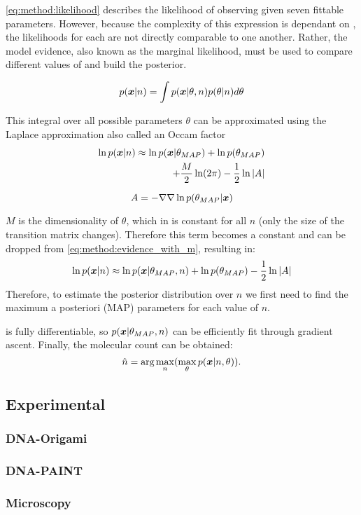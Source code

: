 \eqref{eq:method:likelihood} describes the likelihood of observing \trace given seven fittable parameters.
  However, because the complexity of this expression is dependant on \n, the likelihoods for each \n are not directly comparable to one another.
  Rather, the model evidence, also known as the marginal likelihood, must be used to compare different values of \n and build the posterior. 

  \begin{equation*}
    p(\bm{x} | n) = \int p(\bm{x} | \theta, n) p(\theta | n) d\theta
  \end{equation*}

  This integral over all possible parameters $\theta$ can be approximated using the 
  Laplace approximation also called an Occam factor \cite{bishop_pattern_2006}
  \begin{align*}
    \ln p(\bm{x} | n) \approx \ln p(\bm{x} | \theta_{MAP}) + \ln p(\theta_{MAP}) &\\
    + \frac{M}{2} \ln(2\pi) - \frac{1}{2} \ln |A|
    \label{eq:method:evidence_with_m}
  \end{align*}

  \begin{equation*}
    A = -\nabla \nabla \ln p(\theta_{MAP} | \bm{x})
  \end{equation*}

  $M$ is the dimensionality of $\theta$, which in \ours is constant
  for all $n$ (only the size of the transition matrix changes).
  Therefore this term becomes a constant and can be dropped from 
  \eqref{eq:method:evidence_with_m}, resulting in:
  \begin{equation}
    \ln p(\bm{x} | n) \approx \ln p(\bm{x} | \theta_{MAP}, n) + \ln p(\theta_{MAP}) - \frac{1}{2} \ln |A|
    \label{eq:method:evidence}
  \end{equation}
  Therefore, to estimate the posterior distribution over $n$ we first need to 
  find the maximum a posteriori (MAP) parameters for each value of $n$. 

  \ours is fully differentiable, so $p(\bm{x} | \theta_{MAP}, n)$ can be efficiently 
  fit through gradient ascent.
  Finally, the molecular count can be obtained:
  \begin{equation}
      \hat{n} =
      \text{arg}\max_{n}(
      \max_\theta
      p(\bm{x}|n,\theta))
    \text{.}
    \label{eq:method:optimization}
  \end{equation}

\subsection{Experimental}
\subsubsection{DNA-Origami}
\subsubsection{DNA-PAINT}
\subsubsection{Microscopy}


